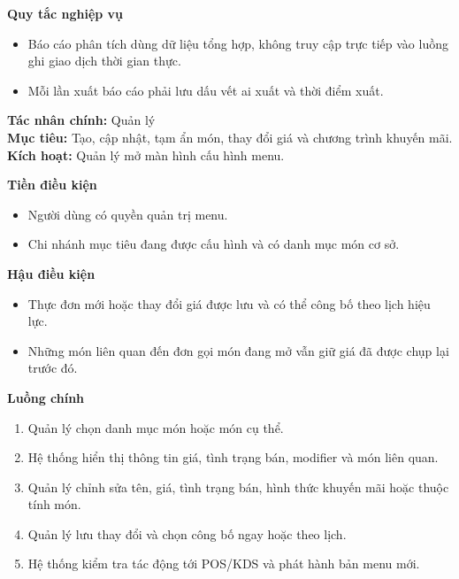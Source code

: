 \documentclass[11pt,a4paper]{article}
\begin{document}
\begin{usecasebox}[title={UC-REP-01 --- Xem báo cáo doanh thu và vận hành}]
    \textbf{Quy tắc nghiệp vụ}
    \begin{itemize}[leftmargin=1.8em]
  \item Báo cáo phân tích dùng dữ liệu tổng hợp, không truy cập trực tiếp vào luồng ghi giao dịch thời gian thực.
  \item Mỗi lần xuất báo cáo phải lưu dấu vết ai xuất và thời điểm xuất.
\end{itemize}
    \end{usecasebox}



    \begin{usecasebox}[title={UC-ADM-01 --- Quản lý menu và giá bán}]
    \textbf{Tác nhân chính:} Quản lý\\
    \textbf{Mục tiêu:} Tạo, cập nhật, tạm ẩn món, thay đổi giá và chương trình khuyến mãi.\\
    \textbf{Kích hoạt:} Quản lý mở màn hình cấu hình menu.

    \medskip
    \textbf{Tiền điều kiện}
    \begin{itemize}[leftmargin=1.8em]
  \item Người dùng có quyền quản trị menu.
  \item Chi nhánh mục tiêu đang được cấu hình và có danh mục món cơ sở.
\end{itemize}

    \textbf{Hậu điều kiện}
    \begin{itemize}[leftmargin=1.8em]
  \item Thực đơn mới hoặc thay đổi giá được lưu và có thể công bố theo lịch hiệu lực.
  \item Những món liên quan đến đơn gọi món đang mở vẫn giữ giá đã được chụp lại trước đó.
\end{itemize}

    \textbf{Luồng chính}
    \begin{enumerate}[leftmargin=1.8em]
  \item Quản lý chọn danh mục món hoặc món cụ thể.
  \item Hệ thống hiển thị thông tin giá, tình trạng bán, modifier và món liên quan.
  \item Quản lý chỉnh sửa tên, giá, tình trạng bán, hình thức khuyến mãi hoặc thuộc tính món.
  \item Quản lý lưu thay đổi và chọn công bố ngay hoặc theo lịch.
  \item Hệ thống kiểm tra tác động tới POS/KDS và phát hành bản menu mới.
\end{enumerate}


\end{usecasebox}
\end{document}
